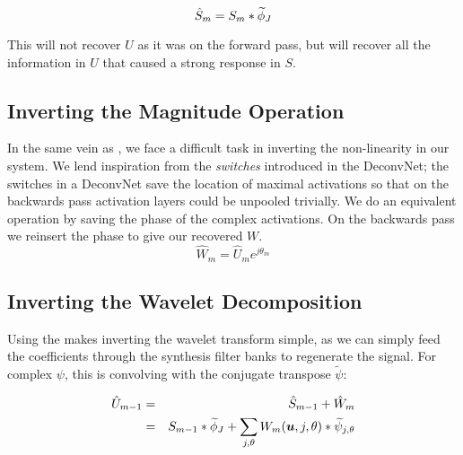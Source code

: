 \begin{equation}
  \label{eq:s_hat}
  \hat{S}_{m} = S_{m} \ast \widetilde{\phi}_J
\end{equation}

This will not recover $U$ as it was on the forward pass, but will recover all
the information in $U$ that caused a strong response in $S$.

\subsection{Inverting the Magnitude Operation}
In the same vein as \cite{zeiler_visualizing_2014}, we face a difficult
task in inverting the non-linearity in our system. 
We lend inspiration from the \emph{switches} introduced in the DeconvNet; the
switches in a DeconvNet save the location of maximal activations so that
on the backwards pass activation layers could be unpooled trivially. We do an
equivalent operation by saving the phase of the complex activations. On the
backwards pass we reinsert the phase to give our recovered $W$.
\begin{equation}
  \label{eq:w_hat}
  \hat{W}_{m} = \hat{U}_{m}e^{j\theta_{m}}
\end{equation}

\subsection{Inverting the Wavelet Decomposition}
Using the \DTCWT makes inverting the wavelet transform simple, as we
can simply feed the coefficients through the synthesis filter banks to regenerate
the signal. For complex $\psi$, this is convolving with the conjugate transpose
$\widetilde{\psi}$: 

\begin{eqnarray}
  \label{eq:x_hat}
  \hat{U}_{m-1} &=& \hat{S}_{m-1} + \hat{W}_{m} \nonumber \\
              &=& S_{m-1} \ast \widetilde{\phi}_J + \sum_{j, \theta} W_{m}(\bm{u}, j,
  \theta) \ast \widetilde{\psi}_{j, \theta}
\end{eqnarray}

